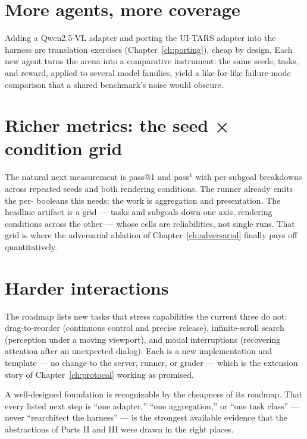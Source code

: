 \documentclass[11pt,openany]{book}
\newcommand{\code}[1]{\textcolor{clayd}{\texttt{\detokenize{#1}}}}
\begin{document}
\section{More agents, more coverage}

Adding a Qwen2.5-VL adapter and porting the UI-TARS adapter into the harness are
translation exercises (Chapter~\ref{ch:porting}), cheap by design. Each new agent
turns the arena into a comparative instrument: the same seeds, tasks, and reward,
applied to several model families, yield a like-for-like failure-mode comparison
that a shared benchmark's noise would obscure.

\section{Richer metrics: the seed × condition grid}

The natural next measurement is pass@1 and pass$^k$ with per-subgoal breakdowns
across repeated seeds and both rendering conditions. The runner already emits the
per-\code{(task, seed)} booleans this needs; the work is aggregation and
presentation. The headline artifact is a grid — tasks and subgoals down one axis,
rendering conditions across the other — whose cells are reliabilities, not single
runs. That grid is where the adversarial ablation of Chapter~\ref{ch:adversarial}
finally pays off quantitatively.

\section{Harder interactions}

The roadmap lists new tasks that stress capabilities the current three do not:
drag-to-reorder (continuous control and precise release), infinite-scroll search
(perception under a moving viewport), and modal interruptions (recovering
attention after an unexpected dialog). Each is a new \code{Task} implementation
and template — no change to the server, runner, or grader — which is the
extension story of Chapter~\ref{ch:protocol} working as promised.

\begin{principle}[.\ ]
A well-designed foundation is recognizable by the cheapness of its roadmap. That
every listed next step is ``one adapter,'' ``one aggregation,'' or ``one task
class'' — never ``rearchitect the harness'' — is the strongest available evidence
that the abstractions of Parts II and III were drawn in the right places.
\end{principle}
\end{document}
